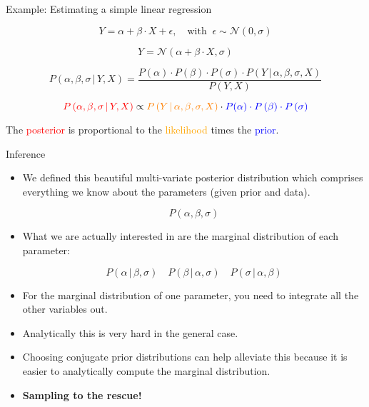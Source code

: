 \documentclass[10pt,handout]{beamer}
\begin{document}
\begin{frame}[t]{Example: Estimating a simple linear regression}

  $$Y = \alpha + \beta \cdot X + \epsilon , \quad\text{with}\;\; \epsilon \sim \mathcal{N}(0, \sigma )$$

  $$Y = \mathcal{N}(\alpha + \beta \cdot X, \sigma)$$

  $$P\left(\alpha , \beta , \sigma\, |\, Y, X\right) = \frac{P(\alpha ) \cdot P\left(\beta \right) \cdot P\left(\sigma \right) \cdot P\left(Y\, |\, \alpha , \beta , \sigma , X\right)}{P\left(Y, X\right)}$$

  \vspace{3em}

  \[
    {\color{red}P\left(\alpha , \beta , \sigma\, |\, Y, X \right)} 
    \propto 
    {\color{orange}P\left(Y\, |\, \alpha , \beta , \sigma , X\right)}
    \cdot
    {\color{blue}P(\alpha ) \cdot P\left(\beta \right) \cdot P\left(\sigma \right) } 
  \]
  
  \vspace{1em}

  The \textcolor{red}{posterior} is proportional to the \textcolor{orange}{likelihood} times the \textcolor{blue}{prior}.




\end{frame}

\begin{frame}[t]{Inference}

  \begin{itemize}
    \item  We defined this beautiful multi-variate posterior distribution which comprises everything we know about the parameters (given prior and data).

  $$
  P\left(\alpha , \beta , \sigma \right)
  $$

\item 
  What we are actually interested in are the marginal distribution of each parameter:

  $$
  P\left(\alpha \, |\, \beta , \sigma\right)
  \quad
  P\left(\beta \, |\, \alpha , \sigma\right)
  \quad
  P\left(\sigma \, |\, \alpha , \beta\right)
  $$

    \item For the marginal distribution of one parameter, you need to integrate all the other variables out.
    \item Analytically this is very hard in the general case.
    \item Choosing conjugate prior distributions can help alleviate this because it is easier to analytically compute the marginal distribution.
    \item \textbf{Sampling to the rescue!}
  \end{itemize}

\end{frame}
\end{document}
